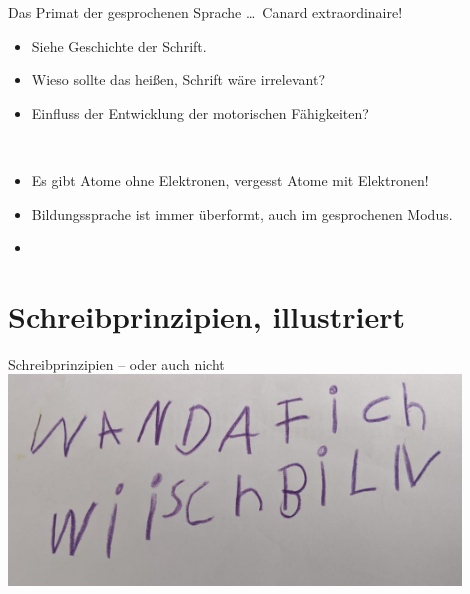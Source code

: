 \begin{frame}
  {Das Primat der gesprochenen Sprache \ldots\ Canard extraordinaire!}
  \\
  \Viertelzeile
  \begin{itemize}[<+->]
    \item Siehe Geschichte der Schrift.
  \end{itemize}
  \Halbzeile
  \Viertelzeile
  \begin{itemize}[<+->]
    \item Wieso sollte das heißen, Schrift wäre irrelevant?
    \item Einfluss der Entwicklung der motorischen Fähigkeiten?\\
  \end{itemize}
  \Halbzeile
  \\
  \Viertelzeile
  \begin{itemize}[<+->]
    \item Es gibt Atome ohne Elektronen, vergesst Atome mit Elektronen!
  \end{itemize}
  \Halbzeile
  \Viertelzeile
  \begin{itemize}[<+->]
    \item Bildungssprache ist immer überformt, auch im gesprochenen Modus.
    \item {}
  \end{itemize}
\end{frame}



\section[Prinzipien]{Schreibprinzipien, illustriert}

\begin{frame}
  {Schreibprinzipien -- oder auch nicht}
  \centering 
  \includegraphics[width=0.9\textwidth]{graphics/wii}\\
  \Halbzeile
\end{frame}

